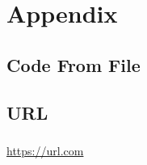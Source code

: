 
    \chapter{Appendix}

      \section{Code From File}
        \ttfamily
        
        \rmfamily

      \section{URL}
        \paragraph{}
          \url{https://url.com}



